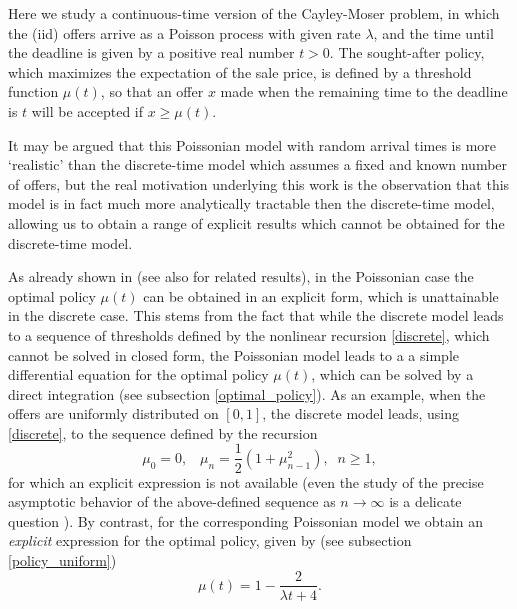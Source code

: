 \documentclass{article}
\numberwithin{equation}{section}
\begin{document}
Here we study a continuous-time version
of the Cayley-Moser problem, in which the (iid) offers 
arrive as a Poisson process with given rate 
$\lambda$, and the time until the deadline is given by a positive real number $t>0$. 
The sought-after policy, which maximizes the expectation of the sale price, is defined by
a threshold function $\mu(t)$, so that an offer $x$ made when the remaining time to the deadline is $t$ will be accepted if $x\geq \mu(t)$.

It may be argued that this Poissonian model with random arrival times is more `realistic' than the discrete-time model which assumes a fixed and known number of offers, but the real motivation underlying this work 
is the observation that this model is in fact much more analytically tractable then the 
discrete-time model, allowing us to obtain a range of explicit results which cannot be obtained for the discrete-time model.

As already shown in \cite{Karlin} (see also \cite{Allaart,David,Elfving,Sakaguichi} for related results), in the Poissonian case the optimal policy $\mu(t)$ can be obtained in an explicit form, which 
is unattainable in the discrete case. This stems from the fact that while the discrete model 
leads to a sequence of thresholds defined by the
nonlinear recursion \eqref{discrete}, which cannot be solved in closed form, the Poissonian model leads to a 
a simple differential equation for the optimal
policy $\mu(t)$, which can be solved by a direct integration (see subsection \ref{optimal_policy}). As an example, when
the offers are uniformly distributed on $[0,1]$,
the discrete model leads, using \eqref{discrete}, to the sequence defined by the recursion
\begin{equation}\label{disc}\mu_0=0,\;\;\;\mu_n=\frac{1}{2}(1+\mu_{n-1}^2),\;\;n\geq 1,
\end{equation}
for which an explicit expression is not available (even the study of the precise  asymptotic behavior of the above-defined sequence as $n\rightarrow \infty$ is a delicate question \cite{entwistle,fitch}). 
By contrast, for the corresponding Poissonian model we obtain an 
{\it{explicit}} expression for the optimal policy, given by
(see subsection \ref{policy_uniform})
\begin{equation}\label{ex0}\mu(t)=1-\frac{2}{\lambda t+4}.
\end{equation}
\end{document}
